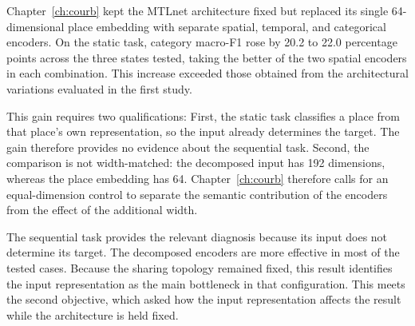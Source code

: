 Chapter~\ref{ch:courb} kept the MTLnet architecture fixed but replaced its single
64-dimensional place embedding with separate spatial, temporal, and categorical
encoders. On the static task, category macro-F1 rose by 20.2 to 22.0 percentage points
across the three states tested, taking the better of the two spatial encoders in each combination. This increase exceeded those obtained from the
architectural variations evaluated in the first study.

This gain requires two qualifications: First, the static task classifies a place from
that place's own representation, so the input already determines the target. The gain
therefore provides no evidence about the sequential task. Second, the comparison is not
width-matched: the decomposed input has 192 dimensions, whereas the place embedding has
64. Chapter~\ref{ch:courb} therefore calls for an equal-dimension control to separate the
semantic contribution of the encoders from the effect of the additional width.

The sequential task provides the relevant diagnosis because its input does not
determine its target. The decomposed encoders are more effective in most of the tested
cases. Because the sharing topology remained fixed, this result identifies the input
representation as the main bottleneck in that configuration. This meets the second
objective, which asked how the input representation affects the result while the
architecture is held fixed.

